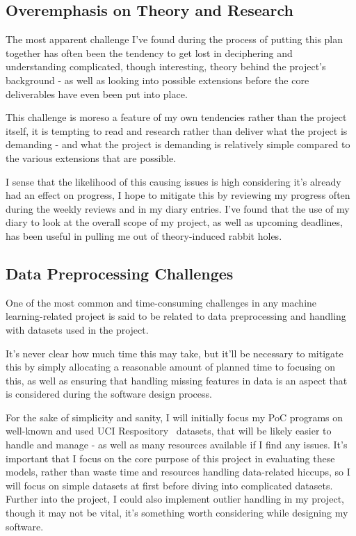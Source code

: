 \documentclass[report,10pt]{article}
\begin{document}
\subsection{Overemphasis on Theory and Research}

The most apparent challenge I've found during the process of putting this plan together has often been the tendency to get lost in deciphering and understanding complicated, though interesting, theory behind the project's background - as well as looking into possible extensions before the core deliverables have even been put into place. \par
This challenge is moreso a feature of my own tendencies rather than the project itself, it is tempting to read and research rather than deliver what the project is demanding - and what the project is demanding is relatively simple compared to the various extensions that are possible. \par
I sense that the likelihood of this causing issues is high considering it's already had an effect on progress, I hope to mitigate this by reviewing my progress often during the weekly reviews and in my diary entries. I've found that the use of my diary to look at the overall scope of my project, as well as upcoming deadlines, has been useful in pulling me out of theory-induced rabbit holes. 

\subsection{Data Preprocessing Challenges}

One of the most common and time-consuming challenges in any machine learning-related project is said to be related to data preprocessing and handling with datasets used in the project. \par
It's never clear how much time this may take, but it'll be necessary to mitigate this by simply allocating a reasonable amount of planned time to focusing on this, as well as ensuring that handling missing features in data is an aspect that is considered during the software design process. \par
For the sake of simplicity and sanity, I will initially focus my PoC programs on well-known and used UCI Respository~\cite{uci} datasets, that will be likely easier to handle and manage - as well as many resources available if I find any issues. It's important that I focus on the core purpose of this project in evaluating these models, rather than waste time and resources handling data-related hiccups, so I will focus on simple datasets at first before diving into complicated datasets. Further into the project, I could also implement outlier handling in my project, though it may not be vital, it's something worth considering while designing my software. \par
\end{document}
